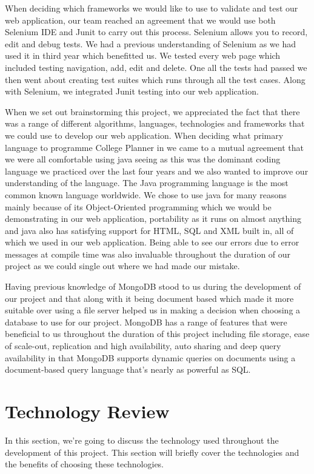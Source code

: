 When deciding which frameworks we would like to use to validate and test our web application, our team reached an agreement that we would use both Selenium IDE and Junit to carry out this process. Selenium allows you to record, edit and debug tests. We had a previous understanding of Selenium as we had used it in third year which benefitted us. We tested every web page which included testing navigation, add, edit and delete. One all the tests had passed we then went about creating test suites which runs through all the test cases. Along with Selenium, we integrated Junit testing into our web application.
\par When we set out brainstorming this project, we appreciated the fact that there was a range of different algorithms, languages, technologies and frameworks that we could use to develop our web application. When deciding what primary language to programme College Planner in we came to a mutual agreement that we were all comfortable using java seeing as this was the dominant coding language we practiced over the last four years and we also wanted to improve our understanding of the language. The Java programming language is the most common known language worldwide\cite{MonicaPawlan}. We chose to use java for many reasons mainly because of its Object-Oriented programming which we would be demonstrating in our web application, portability as it runs on almost anything and java also has satisfying support for HTML, SQL and XML built in, all of which we used in our web application. Being able to see our errors due to error messages at compile time was also invaluable throughout the duration of our project as we could single out where we had made our mistake. \par 
Having previous knowledge of MongoDB stood to us during the development of our project and that along with it being document based which made it more suitable over using a file server helped us in making a decision when choosing a database to use for our project. MongoDB has a range of features that were beneficial to us throughout the duration of this project including file storage, ease of scale-out, replication and high availability, auto sharing and deep query availability in that MongoDB supports dynamic queries on documents using a document-based query language that's nearly as powerful as SQL\cite{Mongo}.


\chapter{Technology Review}
In this section, we're going to discuss the technology used throughout the development of this project. This section will briefly cover the technologies and the benefits of choosing these technologies. 


